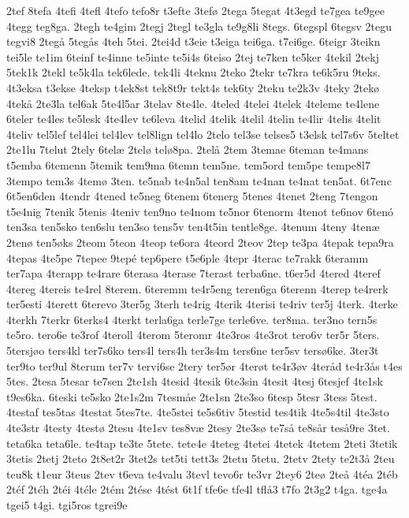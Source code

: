{2tef
8tefa
4tefi
4tefl
4tefo
tefo8r
t3efte
3tefø
2tega
5tegat
4t3egd
te7gea
te9gee
4tegg
teg8ga.
2tegh
te4gim
2tegj
2tegl
te3gla
te9g8li
8tegs.
6tegspl
6tegsv
2tegu
tegvi8
2tegå
5tegås
4teh
5tei.
2tei4d
t3eie
t3eiga
tei6ga.
t7ei6ge.
6teigr
3teikn
tei5le
te1im
6teinf
te4inne
te5inte
te5i4s
6teiso
2tej
te7ken
te5ker
4tekil
2tekj
5tek1k
2tekl
te5k4la
tek6lede.
tek4li
4teknu
2teko
2tekr
te7kra
te6k5ru
9teks.
4t3eksa
t3ekse
4teksp
t4ek8st
tek8t9r
tekt4s
tek6ty
2teku
te2k3v
4teky
2tekø
4tekå
2te3la
tel6ak
5te4l5ar
3telav
8te4le.
4teled
4telei
4telek
4teleme
te4lene
6teler
te4les
te5lesk
4te4lev
te6leva
4telid
4telik
4telil
4telin
te4lir
4telis
4telit
4teliv
tel5lef
tel4lei
tel4lev
tel8lign
tel4lo
2telo
tel3se
telses5
t3elsk
tel7s6v
5teltet
2te1lu
7telut
2tely
6telæ
2telø
telø8pa.
2telå
2tem
3temae
6teman
te4mans
t5emba
6temenn
5temik
tem9ma
6temn
tem5ne.
tem5ord
tem5pe
tempe8l7
3tempo
tem3s
4temø
3ten.
te5nab
te4n5al
ten8am
te4nan
te4nat
ten5at.
6t7enc
6t5en6den
4tendr
4tened
te5neg
6tenem
6tenerg
5tenes
4tenet
2teng
7tengon
t5e4nig
7tenik
5tenis
4teniv
ten9no
te4nom
te5nor
6tenorm
4tenot
te6nov
6tenó
ten3sa
ten5sko
ten6slu
ten3so
tens5v
ten4t5in
tentle8ge.
4tenum
4teny
4tenæ
2tenø
ten5øks
2teom
5teon
4teop
te6ora
4teord
2teov
2tep
te3pa
4tepak
tepa9ra
4tepas
4te5pe
7tepee
9tepé
tep6pere
t5e6ple
4tepr
4terac
te7rakk
6teramm
ter7apa
4terapp
te4rare
6terasa
4terase
7terast
terba6ne.
t6er5d
4tered
4teref
4tereg
4tereis
te4rel
8terem.
6teremm
te4r5eng
teren6ga
6terenn
4terep
te4rerk
ter5esti
4terett
6terevo
3ter5g
3terh
te4rig
4terik
4terisi
te4riv
ter5j
4terk.
4terke
4terkh
7terkr
6terks4
4terkt
terla6ga
terle7ge
terle6ve.
ter8ma.
ter3no
tern5s
te5ro.
tero6e
te3rof
4teroll
4terom
5teromr
4te3ros
4te3rot
tero6v
ter5r
5ters.
5tersjøo
ters4kl
ter7s6ko
ters4l
ters4h
ter3s4m
ters6ne
ter5sv
tersø6ke.
3ter3t
ter9to
ter9ul
8terum
ter7v
tervi6se
2tery
ter5ør
4terøt
te4r3øv
4teråd
te4r3ås
t4es
5tes.
2tesa
5tesar
te7sen
2te1sh
4tesid
4tesik
6te3sin
4tesit
4tesj
6tesjef
4te1sk
t9es6ka.
6teski
te5sko
2te1s2m
7tesmåe
2te1sn
2te3so
6tesp
5tesr
3tess
5test.
4testaf
tes5tas
4testat
5tes7te.
4te5stei
te5s6tiv
5testid
tes4tik
4te5s4til
4te3sto
4te3str
4testy
4testø
2tesu
4te1sv
tes8væ
2tesy
2te3sø
te7så
te8sår
teså9re
3tet.
teta6ka
teta6le.
te4tap
te3te
5tete.
tete4e
4teteg
4tetei
4tetek
4tetem
2teti
3tetik
3tetis
2tetj
2teto
2t8et2r
3tet2s
tet5ti
tett3s
2tetu
5tetu.
2tetv
2tety
te2t3å
2teu
teu8k
t1eur
3teus
2tev
t6eva
te4valu
3tevl
tevo6r
te3vr
2tey6
2teø
2teå
4téa
2téb
2téf
2téh
2téi
4téle
2tém
2tése
4tést
6t1f
tfe6e
tfe4l
tflå3
t7fo
2t3g2
t4ga.
tge4a
tgei5
t4gi.
tgi5ros
tgrei9e
}
